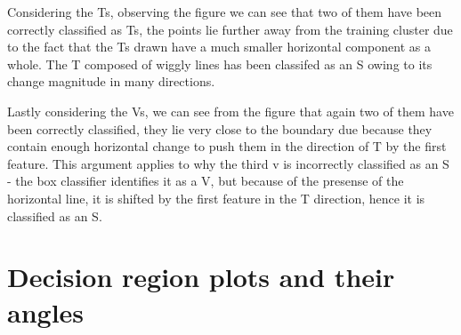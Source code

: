 \documentclass[a4paper,12px,twocolumn]{article}
\begin{document}
\begin{flushleft}
{        \smallskip

        Considering the Ts, observing the figure we can see that two of them have been correctly classified as Ts, the points lie further
        away from the training cluster due to the fact that the Ts drawn have a much smaller horizontal component as a whole. The T composed
        of wiggly lines has been classifed as an S owing to its change magnitude in many directions.

        \smallskip
        Lastly considering the Vs, we can see from the figure that again two of them have been correctly classified, they lie very close
        to the boundary due because they contain enough horizontal change to push them in the direction of T by the first feature. This argument
        applies to why the third v is incorrectly classified as an S - the box classifier identifies it as a V, but because of the presense of
        the horizontal line, it is shifted by the first feature in the T direction, hence it is classified as an S.


    }




\section{Decision region plots and their angles}

\end{flushleft}
\end{document}
